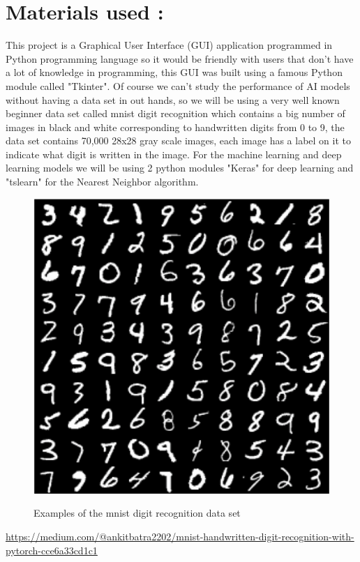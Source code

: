 \documentclass[10pt,a4paper]{article}
\begin{document}
\section{Materials used :}
\large This project is a Graphical User Interface (GUI) application programmed in Python programming language so it would be friendly with users that don't have a lot of knowledge in programming, this GUI was built using a famous Python module called "Tkinter". Of course we can't study the performance of AI models without having a data set in out hands, so we will be using a very well known beginner data set called mnist digit recognition which contains a big number of images in black and white corresponding to handwritten digits from 0 to 9, the data set contains 70,000 28x28 gray scale images, each image has a label on it to indicate what digit is written in the image. For the machine learning and deep learning models we will be using 2 python modules "Keras" for deep learning and "tslearn" for the Nearest Neighbor algorithm.

\begin{figure}[H]
\centering
\includegraphics[scale=0.5]{mnist.png}\\
\caption{Examples of the mnist digit recognition data set}
\end{figure}
\begin{center}
\small\url {https://medium.com/@ankitbatra2202/mnist-handwritten-digit-recognition-with-pytorch-cce6a33cd1c1}
\end{center}
\end{document}
